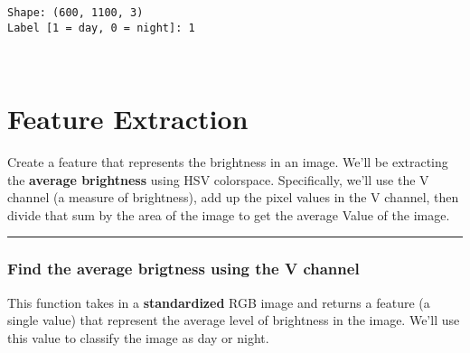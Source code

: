 \documentclass[11pt]{article}
\begin{document}
    \begin{Verbatim}[commandchars=\\\{\}]
Shape: (600, 1100, 3)
Label [1 = day, 0 = night]: 1

    \end{Verbatim}

    \begin{center}
    \end{center}
    { \hspace*{\fill} \\}
    
    \section{Feature Extraction}\label{feature-extraction}

Create a feature that represents the brightness in an image. We'll be
extracting the \textbf{average brightness} using HSV colorspace.
Specifically, we'll use the V channel (a measure of brightness), add up
the pixel values in the V channel, then divide that sum by the area of
the image to get the average Value of the image.

    \begin{center}\rule{0.5\linewidth}{\linethickness}\end{center}

\subsubsection{Find the average brigtness using the V
channel}\label{find-the-average-brigtness-using-the-v-channel}

This function takes in a \textbf{standardized} RGB image and returns a
feature (a single value) that represent the average level of brightness
in the image. We'll use this value to classify the image as day or
night.
\end{document}
